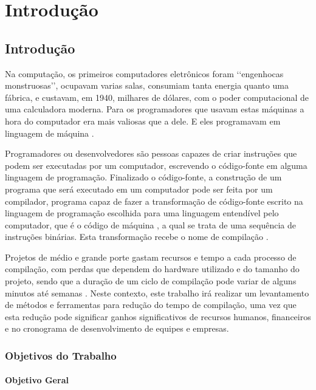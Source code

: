 \part{Introdução}

\chapter*[Introdução]{Introdução}

Na computação, os primeiros computadores eletrônicos foram \lq\lq engenhocas monstruosas\rq\rq,
 ocupavam varias salas, consumiam tanta energia quanto
 uma fábrica, e custavam, em 1940, milhares de dólares, com o poder
 computacional de uma calculadora moderna. Para os
 programadores que usavam estas máquinas a hora do computador era
 mais valiosas que a dele. E eles programavam em linguagem de
 máquina \cite[pág.5]{ref6}.

Programadores ou desenvolvedores são pessoas capazes de criar instruções
 que podem ser executadas por um computador, escrevendo o código-fonte em
 alguma linguagem de programação. Finalizado o código-fonte, a construção
 de um programa que será executado em um computador pode ser feita por um
 compilador, programa capaz de fazer a transformação de
 código-fonte escrito na linguagem de programação escolhida para uma linguagem
 entendível pelo computador, que é o código de máquina \cite[pág.5]{ref6}, a qual
 se trata de uma sequência de instruções binárias.
 Esta transformação recebe o nome de compilação \cite[pág.1]{ref5}.

Projetos de médio e grande porte gastam recursos e tempo a cada processo
 de compilação, com perdas que dependem do hardware utilizado e do tamanho
 do projeto, sendo que a duração de um ciclo de compilação pode variar de
 alguns minutos até semanas \cite[pág.5]{ref6}. Neste contexto, este trabalho
 irá realizar um levantamento de métodos e ferramentas para redução do
 tempo de compilação, uma vez que esta redução pode significar ganhos
 significativos de recursos humanos, financeiros e no cronograma de
 desenvolvimento de equipes e empresas. 

\section*{Objetivos do Trabalho}

\subsection*{Objetivo Geral}

